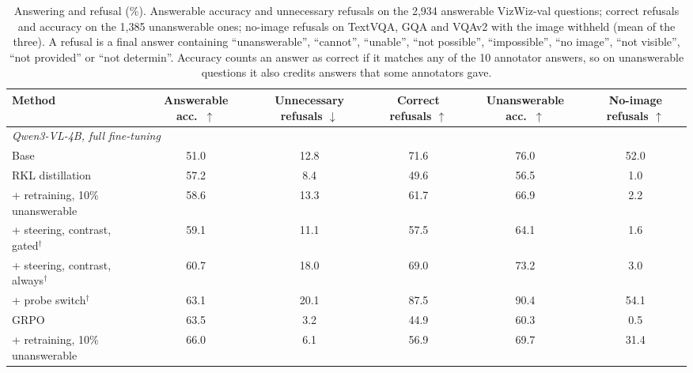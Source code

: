\documentclass[10pt,twocolumn,letterpaper]{article}
\begin{document}
\begin{table}[t]
\centering
\caption{Answering and refusal (\%). Answerable accuracy and unnecessary refusals on the 2{,}934 answerable
VizWiz-val questions; correct refusals and accuracy on the 1{,}385 unanswerable ones; no-image refusals on
TextVQA, GQA and VQAv2 with the image withheld (mean of the three). A refusal is a final answer containing
``unanswerable'', ``cannot'', ``unable'', ``not possible'', ``impossible'', ``no image'', ``not visible'',
``not provided'' or ``not determin''. Accuracy counts an answer as correct if it matches any of the 10
annotator answers, so on unanswerable questions it also credits answers that some annotators gave.}
\label{tab:refusal}
\small
\begin{tabular}{lccccc}
\toprule
Method & Answerable acc.\ $\uparrow$ & Unnecessary refusals $\downarrow$ & Correct refusals $\uparrow$
       & Unanswerable acc.\ $\uparrow$ & No-image refusals $\uparrow$ \\
\midrule
\multicolumn{6}{l}{\textit{Qwen3-VL-4B, full fine-tuning}} \\
Base                                         & 51.0 & 12.8 & 71.6 & 76.0 & 52.0 \\
RKL distillation                             & 57.2 &  8.4 & 49.6 & 56.5 &  1.0 \\
\quad + retraining, 10\% unanswerable        & 58.6 & 13.3 & 61.7 & 66.9 &  2.2 \\
\quad + steering, contrast, gated$^\dagger$  & 59.1 & 11.1 & 57.5 & 64.1 &  1.6 \\
\quad + steering, contrast, always$^\dagger$ & 60.7 & 18.0 & 69.0 & 73.2 &  3.0 \\
\quad + probe switch$^\dagger$               & 63.1 & 20.1 & 87.5 & 90.4 & 54.1 \\
GRPO                                         & 63.5 &  3.2 & 44.9 & 60.3 &  0.5 \\
\quad + retraining, 10\% unanswerable        & 66.0 &  6.1 & 56.9 & 69.7 & 31.4 \\

\end{tabular}
\end{table}
\end{document}
